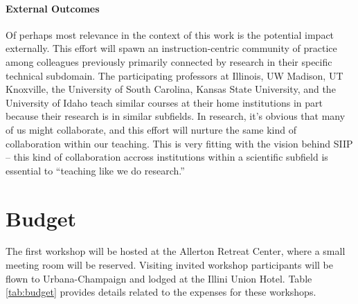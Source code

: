 \documentclass[11pt]{article}
\begin{document}
          \paragraph{External Outcomes}

          Of perhaps most relevance in the context of this work is the 
          potential impact externally. This effort will spawn an 
          instruction-centric community of 
          practice among colleagues previously primarily connected by research 
          in their specific technical subdomain. 
          The participating professors at Illinois, UW Madison, UT Knoxville, 
          the University of South Carolina, Kansas State University, and the 
          University of Idaho teach similar courses at their home institutions 
          in part because their research is in similar subfields. In research, 
          it's obvious that many of us might collaborate, and this effort will 
          nurture the same kind of collaboration within our teaching. This is 
          very fitting with the vision behind SIIP -- this kind of collaboration 
          accross institutions within a scientific subfield is essential to 
          ``teaching like we do research.'' 

          \section{Budget}
          The first workshop will be hosted at the Allerton Retreat Center, 
          where a small meeting room will be reserved. Visiting 
          invited workshop participants will be flown to Urbana-Champaign and 
          lodged at the Illini Union Hotel. Table \ref{tab:budget} provides 
          details related to the expenses for these workshops.
\end{document}
